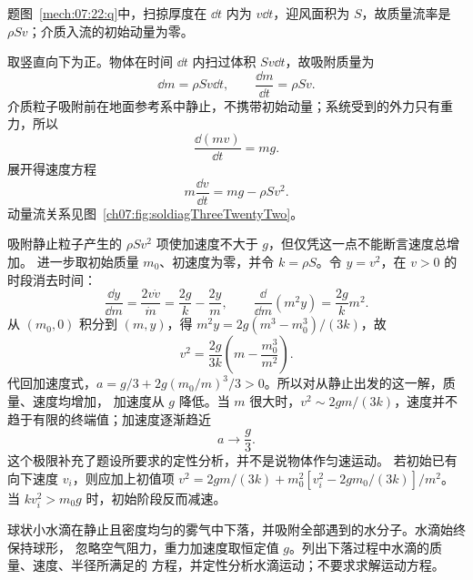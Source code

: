 {\begin{origexamplebox}{}
\begin{qualityfigure}
\label{mech:07:22:q}
\end{qualityfigure}
\end{origexamplebox}

\begin{xesolution}题图~\ref{mech:07:22:q}中，扫掠厚度在 $\dd t$ 内为 $v\dd t$，迎风面积为 $S$，故质量流率是 $\rho Sv$；介质入流的初始动量为零。

取竖直向下为正。物体在时间 $\dd t$ 内扫过体积 $Sv\dd t$，故吸附质量为
\[
 \dd m=\rho Sv\dd t,
 \qquad
 \boxed{\frac{\dd m}{\dd t}=\rho Sv}.
\]
介质粒子吸附前在地面参考系中静止，不携带初始动量；系统受到的外力只有重力，所以
\[
 \boxed{\frac{\dd(mv)}{\dd t}=mg}.
\]
展开得速度方程
\[
 \boxed{m\frac{\dd v}{\dd t}=mg-\rho Sv^2}.
\]
动量流关系见图~\ref{ch07:fig:soldiagThreeTwentyTwo}。

\soldiagThreeTwentyTwo
吸附静止粒子产生的 $\rho Sv^2$ 项使加速度不大于 $g$，但仅凭这一点不能断言速度总增加。
进一步取初始质量 $m_0$、初速度为零，并令 $k=\rho S$。令 $y=v^2$，在 $v>0$ 的时段消去时间：
\[
 \frac{\dd y}{\dd m}=\frac{2v\dot v}{\dot m}
 =\frac{2g}{k}-\frac{2y}{m},\qquad
 \frac{\dd}{\dd m}(m^2y)=\frac{2g}{k}m^2.
\]
从 $(m_0,0)$ 积分到 $(m,y)$，得 $m^2y=2g(m^3-m_0^3)/(3k)$，故
\[
 v^2=\frac{2g}{3k}\left(m-\frac{m_0^3}{m^2}\right).
\]
代回加速度式，$a=g/3+2g(m_0/m)^3/3>0$。所以对从静止出发的这一解，质量、速度均增加，
加速度从 $g$ 降低。当 $m$ 很大时，$v^2\sim2gm/(3k)$，速度并不趋于有限的终端值；加速度逐渐趋近
\[
 \boxed{a\to\frac{g}{3}}.
\]
这个极限补充了题设所要求的定性分析，并不是说物体作匀速运动。
若初始已有向下速度 $v_i$，则应加上初值项
$v^2=2gm/(3k)+m_0^2[v_i^2-2gm_0/(3k)]/m^2$。当 $kv_i^2>m_0g$ 时，初始阶段反而减速。
\end{xesolution}

\begin{origexamplebox}{}\label{ch07:ex:s08-3-23}
球状小水滴在静止且密度均匀的雾气中下落，并吸附全部遇到的水分子。水滴始终保持球形，
忽略空气阻力，重力加速度取恒定值 $g$。列出下落过程中水滴的质量、速度、半径所满足的
方程，并定性分析水滴运动；不要求求解运动方程。


\end{origexamplebox}}
